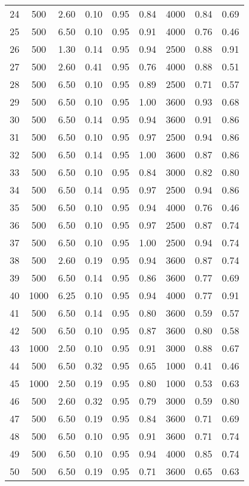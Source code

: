 \begin{longtable}[c]{ccccccccc}
24 &   500 &  2.60 &  0.10 &  0.95 &  0.84 &  4000 &  0.84 &  0.69 \\
25 &   500 &  6.50 &  0.10 &  0.95 &  0.91 &  4000 &  0.76 &  0.46 \\
26 &   500 &  1.30 &  0.14 &  0.95 &  0.94 &  2500 &  0.88 &  0.91 \\
27 &   500 &  2.60 &  0.41 &  0.95 &  0.76 &  4000 &  0.88 &  0.51 \\
28 &   500 &  6.50 &  0.10 &  0.95 &  0.89 &  2500 &  0.71 &  0.57 \\
29 &   500 &  6.50 &  0.10 &  0.95 &  1.00 &  3600 &  0.93 &  0.68 \\
30 &   500 &  6.50 &  0.14 &  0.95 &  0.94 &  3600 &  0.91 &  0.86 \\
31 &   500 &  6.50 &  0.10 &  0.95 &  0.97 &  2500 &  0.94 &  0.86 \\
32 &   500 &  6.50 &  0.14 &  0.95 &  1.00 &  3600 &  0.87 &  0.86 \\
33 &   500 &  6.50 &  0.10 &  0.95 &  0.84 &  3000 &  0.82 &  0.80 \\
34 &   500 &  6.50 &  0.14 &  0.95 &  0.97 &  2500 &  0.94 &  0.86 \\
35 &   500 &  6.50 &  0.10 &  0.95 &  0.94 &  4000 &  0.76 &  0.46 \\
36 &   500 &  6.50 &  0.10 &  0.95 &  0.97 &  2500 &  0.87 &  0.74 \\
37 &   500 &  6.50 &  0.10 &  0.95 &  1.00 &  2500 &  0.94 &  0.74 \\
38 &   500 &  2.60 &  0.19 &  0.95 &  0.94 &  3600 &  0.87 &  0.74 \\
39 &   500 &  6.50 &  0.14 &  0.95 &  0.86 &  3600 &  0.77 &  0.69 \\
40 &  1000 &  6.25 &  0.10 &  0.95 &  0.94 &  4000 &  0.77 &  0.91 \\
41 &   500 &  6.50 &  0.14 &  0.95 &  0.80 &  3600 &  0.59 &  0.57 \\
42 &   500 &  6.50 &  0.10 &  0.95 &  0.87 &  3600 &  0.80 &  0.58 \\
43 &  1000 &  2.50 &  0.10 &  0.95 &  0.91 &  3000 &  0.88 &  0.67 \\
44 &   500 &  6.50 &  0.32 &  0.95 &  0.65 &  1000 &  0.41 &  0.46 \\
45 &  1000 &  2.50 &  0.19 &  0.95 &  0.80 &  1000 &  0.53 &  0.63 \\
46 &   500 &  2.60 &  0.32 &  0.95 &  0.79 &  3000 &  0.59 &  0.80 \\
47 &   500 &  6.50 &  0.19 &  0.95 &  0.84 &  3600 &  0.71 &  0.69 \\
48 &   500 &  6.50 &  0.10 &  0.95 &  0.91 &  3600 &  0.71 &  0.74 \\
49 &   500 &  6.50 &  0.10 &  0.95 &  0.94 &  4000 &  0.85 &  0.74 \\
50 &   500 &  6.50 &  0.19 &  0.95 &  0.71 &  3600 &  0.65 &  0.63 \\
\bottomrule
\end{longtable}

